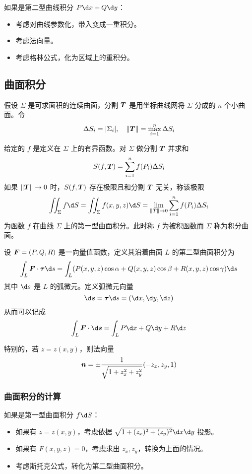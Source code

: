 如果是第二型曲线积分 $P \d x + Q \d y$：
\begin{itemize}
	\item 考虑对曲线参数化，带入变成一重积分。
	\item 考虑法向量。
	\item 考虑格林公式，化为区域上的重积分。
\end{itemize}

\subsection{曲面积分}

假设 $\Sigma$ 是可求面积的连续曲面，分割 $\boldsymbol{T}$ 是用坐标曲线网将 $\Sigma$ 分成的 $n$ 个小曲面。令
\[ \Delta S_i = |\Sigma_i|, \quad \|\boldsymbol{T}\| = \max_{i=1}^n \Delta S_i \]


\begin{definition}[第一型曲面积分]
	给定的 $f$ 是定义在 $\Sigma$ 上的有界函数。对 $\Sigma$ 做分割 $\boldsymbol{T}$ 并求和
	\[ S(f, \boldsymbol{T}) = \sum_{i=1}^{n} f(P_i)\Delta S_i \]
	如果 $\|\boldsymbol{T}\| \to 0$ 时，$S(f, \boldsymbol{T})$ 存在极限且和分割 $\boldsymbol{T}$ 无关，称该极限
	\[ \iint_\Sigma f \d S = \iint_{\Sigma} f(x, y, z) \d S = \lim_{\|T\| \to 0} \sum_{i=1}^{n} f(P_i) \Delta S_i \]
	为函数 $f$ 在曲线 $\Sigma$ 上的第一型曲面积分。此时称 $f$ 为被积函数而 $\Sigma$ 称为积分曲面。
\end{definition}

\begin{definition}[第二型曲面积分]
	设 $\boldsymbol{F} = (P, Q, R)$ 是一向量值函数，定义其沿着曲面 $L$ 的第二型曲面积分为
	\[ \int_L \vbf{F} \cdot \vbf{\tau} \d s = \int_L (P(x,y,z) \cos \alpha + Q(x, y, z) \cos \beta + R(x, y, z) \cos \gamma) \d s \]
	其中 $\d s$ 是 $L$ 的弧微元。定义弧微元向量
	\[ \d \vbf{s} = \vbf{\tau} \d s = (\d x, \d y, \d z) \]
	从而可以记成
	\[ \int_L \vbf{F} \cdot \d \vbf{s} = \int_L P \d x + Q \d y + R \d z \]
\end{definition}


特别的，若 $z = z(x, y)$，则法向量
\[ \boldsymbol{n} = \pm \frac{1}{\sqrt{1 + z_x^2 + z_y^2}} (-z_x, z_y, 1) \]

\subsubsection*{曲面积分的计算}

如果是第一型曲面积分 $f \d S$：
\begin{itemize}
	\item 如果有 $z = z(x, y)$，考虑依据 $\sqrt{1 + (z_x)^2 + (z_y)^2} \d x \d y$ 投影。
	\item 如果有 $F(x, y, z) = 0$，考虑求出 $z_x, z_y$，转换为上面的情况。
	\item 考虑斯托克公式，转化为第二型曲面积分。
\end{itemize}

